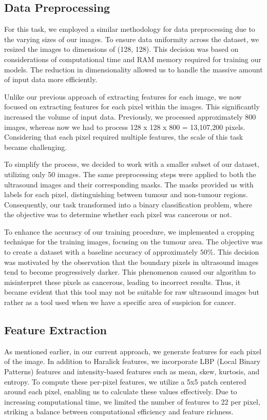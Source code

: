 \subsection{Data Preprocessing}
For this task, we employed a similar methodology for data preprocessing due to the varying sizes of our images. To ensure data uniformity across the dataset, we resized the images to dimensions of (128, 128). This decision was based on considerations of computational time and RAM memory required for training our models. The reduction in dimensionality allowed us to handle the massive amount of input data more efficiently.

Unlike our previous approach of extracting features for each image, we now focused on extracting features for each pixel within the images. This significantly increased the volume of input data. Previously, we processed approximately 800 images, whereas now we had to process 128 x 128 x 800 = 13,107,200 pixels. Considering that each pixel required multiple features, the scale of this task became challenging.

To simplify the process, we decided to work with a smaller subset of our dataset, utilizing only 50 images. The same preprocessing steps were applied to both the ultrasound images and their corresponding masks. The masks provided us with labels for each pixel, distinguishing between tumour and non-tumour regions. Consequently, our task transformed into a binary classification problem, where the objective was to determine whether each pixel was cancerous or not.

To enhance the accuracy of our training procedure, we implemented a cropping technique for the training images, focusing on the tumour area. The objective was to create a dataset with a baseline accuracy of approximately $50\%$. This decision was motivated by the observation that the boundary pixels in ultrasound images tend to become progressively darker. This phenomenon caused our algorithm to misinterpret these pixels as cancerous, leading to incorrect results. Thus, it became evident that this tool may not be suitable for raw ultrasound images but rather as a tool used when we have a specific area of suspicion for cancer.

\subsection{Feature Extraction}
As mentioned earlier, in our current approach, we generate features for each pixel of the image. In addition to Haralick features, we incorporate LBP (Local Binary Patterns) features and intensity-based features such as mean, skew, kurtosis, and entropy. To compute these per-pixel features, we utilize a 5x5 patch centered around each pixel, enabling us to calculate these values effectively. Due to increasing computational time, we limited the number of features to 22 per pixel, striking a balance between computational efficiency and feature richness.

